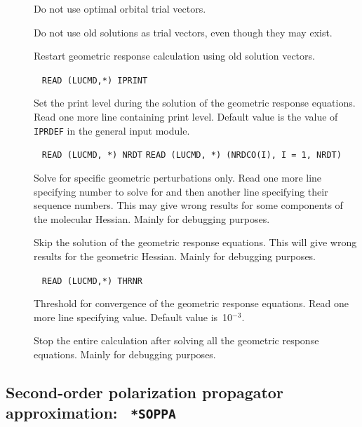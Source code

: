 \begin{description}
\item[] Do not use optimal orbital 
trial vectors. 

\item[] Do not use old solutions as trial vectors, even
though they may exist.

\item[] Restart geometric response calculation using old
solution vectors.

\item[]\verb| |\newline
\verb|READ (LUCMD,*) IPRINT|

Set the print level during the solution of the geometric response
equations.  Read one more line containing print level. Default
value is the value of \verb|IPRDEF| in the general input module.

\item[]\verb| |\newline
\verb|READ (LUCMD, *) NRDT|\newline
\verb|READ (LUCMD, *) (NRDCO(I), I = 1, NRDT)|

Solve for specific geometric perturbations only.  Read
one more line specifying number to solve for and then another
line specifying their sequence numbers. This may give wrong results
for some components of the molecular Hessian. Mainly for debugging
purposes. 

\item[] Skip the solution of the geometric response
equations. This will give wrong results for the geometric Hessian.
Mainly for debugging purposes.

\item[]\verb| |\newline
\verb|READ (LUCMD,*) THRNR|

Threshold for convergence of the geometric response
equations.  Read one more line specifying value.  Default
value is~10$^{-3}$.

\item[] Stop the entire calculation after solving all
the geometric  response equations. Mainly for debugging purposes.
\end{description}

\subsection{Second-order polarization propagator approximation: {\tt
*SOPPA}}\label{sec:soppa}


